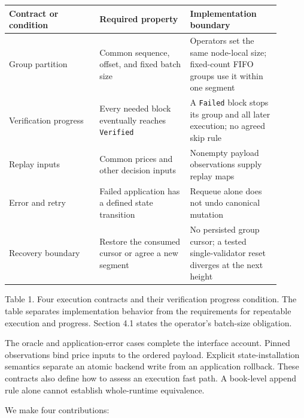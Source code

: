 \documentclass[11pt]{article}
\begin{document}
\begin{center}\begin{minipage}{\linewidth}
{\small\begin{tabular}{@{}p{0.300\linewidth}p{0.300\linewidth}p{0.300\linewidth}@{}}
\toprule
Contract or condition & Required property & Implementation boundary \\
\midrule
Group partition & Common sequence, offset, and fixed batch size & Operators set the same node-local size; fixed-count FIFO groups use it within one segment \\
Verification progress & Every needed block eventually reaches \texttt{Verified} & A \texttt{Failed} block stops its group and all later execution; no agreed skip rule \\
Replay inputs & Common prices and other decision inputs & Nonempty payload observations supply replay maps \\
Error and retry & Failed application has a defined state transition & Requeue alone does not undo canonical mutation \\
Recovery boundary & Restore the consumed cursor or agree a new segment & No persisted group cursor; a tested single-validator reset diverges at the next height \\
\bottomrule
\end{tabular}}
\par\smallskip Table 1. Four execution contracts and their verification progress condition. The table separates implementation behavior from the requirements for repeatable execution and progress. Section 4.1 states the operator's batch-size obligation.
\end{minipage}\end{center}
The oracle and application-error cases complete the interface account. Pinned observations bind price inputs to the ordered payload. Explicit state-installation semantics separate an atomic backend write from an application rollback. These contracts also define how to assess an execution fast path. A book-level append rule alone cannot establish whole-runtime equivalence.

We make four contributions:
\end{document}
